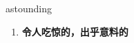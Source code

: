 
\begin{frame}
{\huge astounding}
\begin{center}
\begin{enumerate}\Large
  \item \textbf{令人吃惊的，出乎意料的}
\end{enumerate}
\end{center}
\end{frame}
